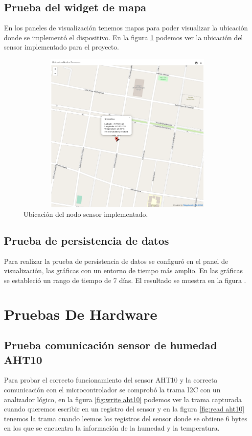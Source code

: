 \subsection{Prueba del widget de mapa}
En los paneles de visualización tenemos mapas para poder visualizar la ubicación donde se implementó el dispositivo.
En la figura \ref{fig:map thingsboard}  podemos ver la ubicación del sensor implementado para el proyecto.

\begin{figure}[h!]
  \centering
    \includegraphics[width=12cm, height=8cm]{./Figures/map.png}
  \caption{Ubicación del nodo sensor implementado.}
    \label{fig:map thingsboard}
\end{figure}

\subsection{Prueba de persistencia de datos}
Para realizar la prueba de persistencia de datos se configuró en el panel de visualización, las gráficas con un entorno de tiempo más amplio.
En las gráficas se estableció un rango de tiempo de 7 días. El resultado se muestra en la figura .



\clearpage 
\section{Pruebas De Hardware}
\subsection{Prueba comunicación sensor de humedad AHT10}
Para probar el correcto funcionamiento del sensor AHT10 y la correcta comunicación con el microcontrolador se comprobó la trama I2C con un analizador lógico,
en la figura \ref{fig:write aht10} podemos ver la trama capturada cuando queremos escribir en un registro del sensor y en la figura \ref{fig:read aht10} tenemos la trama cuando leemos los registros del sensor donde se obtiene 6 bytes en los que se encuentra la información de la humedad y la temperatura.

